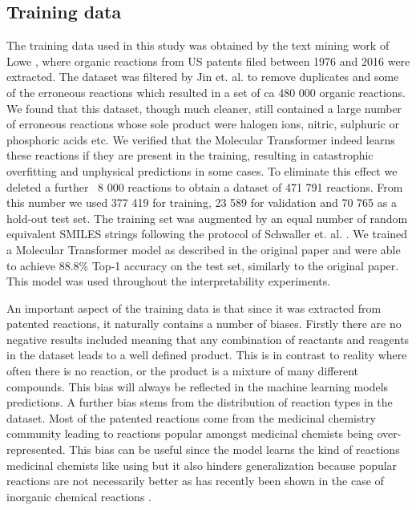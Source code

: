 \subsection{Training data}
The training data used in this study was obtained by the text mining work of Lowe \cite{Lowe2012}, where organic reactions from US patents filed between 1976 and 2016 were extracted. The dataset was filtered by Jin et. al. \cite{Jin2017} to remove duplicates and some of the erroneous reactions which resulted in a set of ca 480 000 organic reactions. We found that this dataset, though much cleaner, still contained a large number of erroneous reactions whose sole product were halogen ions, nitric, sulphuric or phosphoric acids etc. We verified that the Molecular Transformer indeed learns these reactions if they are present in the training, resulting in catastrophic overfitting and unphysical predictions in some cases. To eliminate this effect we deleted a further ~8 000 reactions to obtain a dataset of 471 791 reactions. From this number we used 377 419 for training, 23 589 for validation and 70 765 as a hold-out test set. The training set was augmented by an equal number of random equivalent SMILES strings following the protocol of Schwaller et. al. \cite{Schwaller2019}. We trained a Molecular Transformer model as described in the original paper and were able to achieve 88.8\% Top-1 accuracy on the test set, similarly to the original paper. This model was used throughout the interpretability experiments.

An important aspect of the training data is that since it was extracted from patented reactions, it naturally contains a number of biases. Firstly there are no negative results included meaning that any combination of reactants and reagents in the dataset leads to a well defined product. This is in contrast to reality where often there is no reaction, or the product is a mixture of many different compounds. This bias will always be reflected in the machine learning models predictions. A further bias stems from the distribution of reaction types in the dataset. Most of the patented reactions come from the medicinal chemistry community leading to reactions popular amongst medicinal chemists being over-represented. This bias can be useful since the model learns the kind of reactions medicinal chemists like using \cite{Bjerrun2020} but it also hinders generalization because popular reactions are not necessarily better as has recently been shown in the case of inorganic chemical reactions \cite{Jia2019}.

